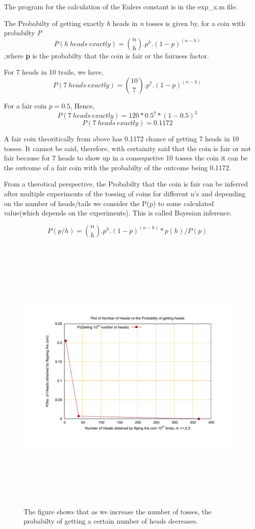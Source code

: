 \documentclass[fleqn,letterpaper,12pt]{report}
\begin{document}
The program for the calculation of the Eulers constant is in the {\color{blue} exp\_x.m} file.
%

\newpage
{}
{}
\problem
The Probabilty of getting exactly {\em h} heads in {\em n} tosses is given by, for a coin with probabilty {\em  P} 
$$ P(h\ heads\ exactly) = \binom{n}{h}.p^h.(1-p)^{(n-h)} $$
,where {\bf p} is the probabilty that the coin is fair or the fairness factor. 

For 7 heads in 10 trails, we have,
$$ P(7\ heads\ exactly) = \binom{10}{7}.p^7.(1-p)^{(n-h)} $$

For a fair coin $ p=0.5$, Hence,
$$ P(7\ heads\ exactly) = 120*0.5^7*(1-0.5)^3 $$
$$ P(7\ heads\ exactly) = 0.1172 $$

A fair coin theoritically from above has 0.1172 chance of getting 7 heads in 10 tosses. It cannot be said, therefore, with certainity said that the coin is fair or not fair because for 7 heads to show up in a consequetive 10 tosses the coin it can be the outcome of a fair coin with the probabilty of the outcome being 0.1172. 

From a therotical perspective, the Probabilty that the coin is fair can be inferred after multiple experiments of the tossing of coins for different n's and depending on the number of heads/tails we consider the P(p) to some calculated value(which depends on the experiments). This is called Bayesian inference.  

$$ P(p/h) = {{\binom{n}{h}.p^h.(1-p)^{(n-h)}}*p(h)}/P(p) $$

\clearpage
\begin{figure}[ht!]
	\centering
	\includegraphics[height=140mm,width=140mm]{CoinFlip_single.pdf}\caption{The figure shows that as we increase the number of tosses, the probabilty of getting a certain number of heads decreases. 
 \label{overflow}}
\end{figure}
\clearpage
\end{document}
